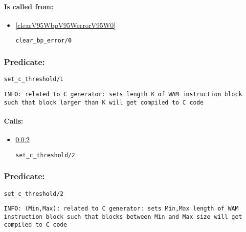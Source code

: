 \paragraph{Is called from:} 
\begin{itemize}
\item \ref{clearV95WbpV95WerrorV95W0} 
\begin{verbatim}
clear_bp_error/0
\end{verbatim}

\end{itemize}

\subsubsection{Predicate:} \label{setV95WcV95WthresholdV95W1}

\begin{verbatim}
set_c_threshold/1
\end{verbatim}

{\small \begin{verbatim}
INFO: related to C generator: sets length K of WAM instruction block such that block larger than K will get compiled to C code

\end{verbatim}}
\paragraph{Calls:} 
\begin{itemize}
\item \ref{setV95WcV95WthresholdV95W2} 
\begin{verbatim}
set_c_threshold/2
\end{verbatim}

\end{itemize}

\subsubsection{Predicate:} \label{setV95WcV95WthresholdV95W2}

\begin{verbatim}
set_c_threshold/2
\end{verbatim}

{\small \begin{verbatim}
INFO: (Min,Max): related to C generator: sets Min,Max length of WAM instruction block such that blocks between Min and Max size will get compiled to C code

\end{verbatim}}
